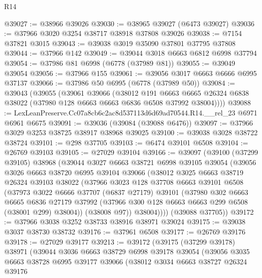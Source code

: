 \begin{lexlean}{R14}
\begin{coremodule}
@39027 := @38966 @39026
@39030 := @38965 @39027 (@6473 @39027)
@39036 := @37966 @3020 @3254 @38717 @38918 @37808 @39026
@39038 := @7154 @37821 @3015
@39043 := @39038 @3019 @35090 @37801 @37795 @37808
@39044 := @37966 @142
@39049 := @39044 @3018 @6663 @6812 @6998 @37794
@39054 := @37986 @81 @6998 (@6778 (@37989 @81))
@39055 := @39049 @39054
@39056 := @37966 @155
@39061 := @39056 @3017 @6663 @6666 @6995 @37137
@39066 := @37986 @50 @6995 (@6778 (@37989 @50))
@39084 := @39043
    (@39055
      (@39061
        @39066
        (@38012
          @191
          @6663
          @6665
          @26324
          @6838
          @38022
          (@37980 @128 @6663 @6663 @6836 @6508 @37992 @38004))))
@39088 := LexLeanPreserve.Cc07a8cb6c2ac8d537113d6d69ad70544.R14.__rel_23 @6971 @6961 @6675
@39091 := @39036 (@39084 (@39088 @6476))
@39097 := @37966 @3029 @3253 @38725 @38917 @38968 @39025
@39100 := @39038 @3028 @38722 @38724
@39101 := @298 @37705
@39103 := @6474 @39101 @6508
@39104 := @26769 @39103
@39105 := @27029 @39104
@39166 := @39097
    (@39100
      (@37299 @39105)
      @38968
      (@39044
        @3027
        @6663
        @38721
        @6998
        @39105
        @39054
        (@39056
          @3026
          @6663
          @38720
          @6995
          @39104
          @39066
          (@38012
            @3025
            @6663
            @38719
            @26324
            @39103
            @38022
            (@37966
              @3023
              @128
              @37708
              @6663
              @39101
              @6508
              (@37973
                @3022
                @6666
                @37707
                (@6837 @27179)
                @39101
                (@37980
                  @302
                  @6663
                  @6665
                  @6836
                  @27179
                  @37992
                  (@37966 @300 @128 @6663 @6663 @299 @6508 (@38001 @299) @38004))
                (@38008 @97))
              @38004))))
      (@39088 @37705))
@39172 := @37966 @3038 @3252 @38733 @38916 @38971 @39024
@39175 := @39038 @3037 @38730 @38732
@39176 := @37961 @6508
@39177 := @26769 @39176
@39178 := @27029 @39177
@39213 := @39172
    (@39175
      (@37299 @39178)
      @38971
      (@39044
        @3036
        @6663
        @38729
        @6998
        @39178
        @39054
        (@39056
          @3035
          @6663
          @38728
          @6995
          @39177
          @39066
          (@38012
            @3034
            @6663
            @38727
            @26324
            @39176

\end{coremodule}
\end{lexlean}
